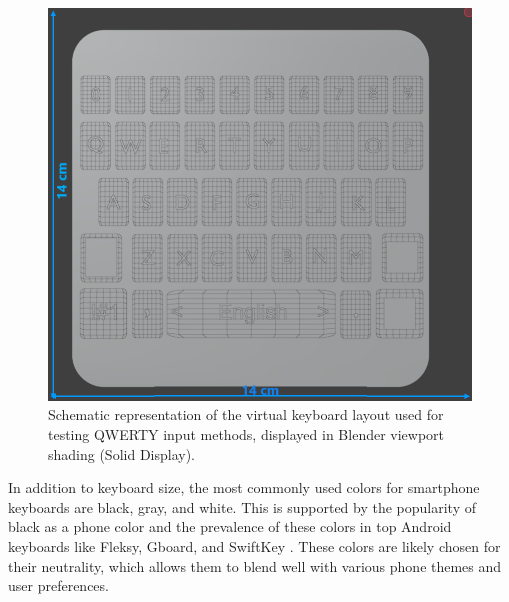 \begin{figure}[h!]
    \centering
    \includegraphics[width=0.7\linewidth]{Development/keyboard_size.png}
    \caption{Schematic representation of the virtual keyboard layout used for testing QWERTY input methods, displayed in Blender viewport shading (Solid Display).}
    \label{fig:keyboard_sin}
\end{figure}
\noindent
In addition to keyboard size, the most commonly used colors for smartphone keyboards are black, gray, and white. This is supported by the popularity of black as a phone color and the prevalence of these colors in top Android keyboards like Fleksy, Gboard, and SwiftKey \cite{Muelaner2023}. These colors are likely chosen for their neutrality, which allows them to blend well with various phone themes and user preferences.\\ \\


